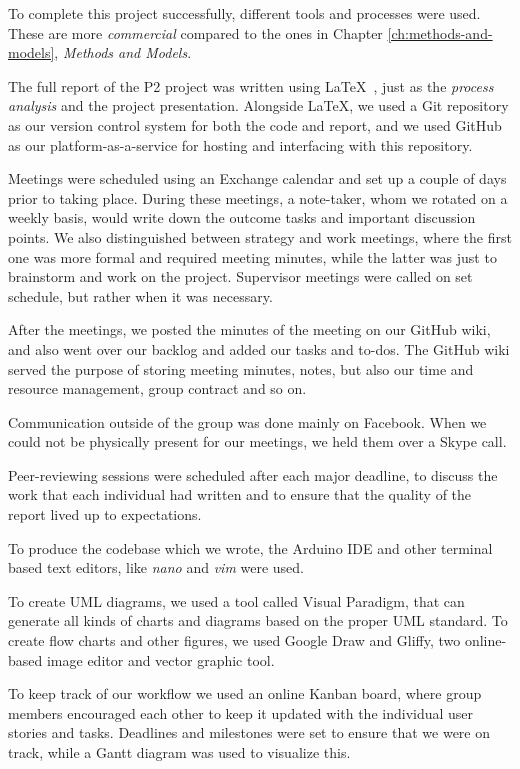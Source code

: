 To complete this project successfully, different tools and processes were used. These are more \textit{commercial} compared to the ones in Chapter \ref{ch:methods-and-models}, \textit{Methods and Models}.

The full report of the P2 project was written using \LaTeX ~, just as the \textit{process analysis} and the project presentation. Alongside \LaTeX , we used a Git repository as our version control system for both the code and report, and we used GitHub as our platform-as-a-service for hosting and interfacing with this repository.

Meetings were scheduled using an Exchange calendar and set up a couple of days prior to taking place. During these meetings, a note-taker, whom we rotated on a weekly basis, would write down the outcome tasks and important discussion points. We also distinguished between strategy and work meetings, where the first one was more formal and required meeting minutes, while the latter was just to brainstorm and work on the project. Supervisor meetings were called on set schedule, but rather when it was necessary.

After the meetings, we posted the minutes of the meeting on our GitHub wiki, and also went over our backlog and added our tasks and to-dos. The GitHub wiki served the purpose of storing meeting minutes, notes, but also our time and resource management, group contract and so on. 

Communication outside of the group was done mainly on Facebook. When we could not be physically present for our meetings, we held them over a Skype call.

Peer-reviewing sessions were scheduled after each major deadline, to discuss the work that each individual had written and to ensure that the quality of the report lived up to expectations.

To produce the codebase which we wrote, the Arduino IDE and other terminal based text editors, like \textit{nano} and \textit{vim} were used.

To create UML diagrams, we used a tool called Visual Paradigm, that can generate all kinds of charts and diagrams based on the proper UML standard. To create flow charts and other figures, we used Google Draw and Gliffy, two online-based image editor and vector graphic tool.

To keep track of our workflow we used an online Kanban board, where group members encouraged each other to keep it updated with the individual user stories and tasks. Deadlines and milestones were set to ensure that we were on track, while a Gantt diagram was used to visualize this.

